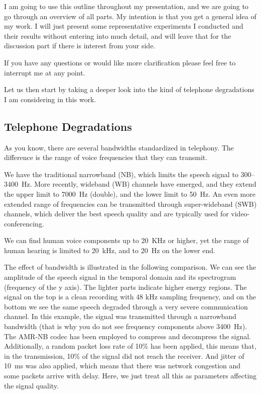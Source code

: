 \documentclass[a4paper]{article}
\begin{document}
I am going to use this outline throughout my presentation, and we are going to go through an overview of all parts. My intention is that you get a general idea of my work. I will just present some representative experiments I conducted and their results without entering into much detail, and will leave that for the discussion part if there is interest from your side.

If you have any questions or would like more clarification please feel free to interrupt me at any point.

Let us then start by taking a deeper look into the kind of telephone degradations I am considering in this work.



\subsection{Telephone Degradations}

As you know, there are several bandwidths standardized in telephony. The difference is the range of voice frequencies that they can transmit. 

We have the traditional narrowband (NB), which limits the speech signal to 300--3400~Hz. More recently, wideband (WB) channels have emerged, and they extend the upper limit to 7000~Hz (double), and the lower limit to 50~Hz. An even more extended range of frequencies can be transmitted through super-wideband (SWB) channels, which deliver the best speech quality and are typically used for video-conferencing.

We can find human voice components up to 20~KHz or higher, yet the range of human hearing is limited to 20~kHz, and to 20~Hz on the lower end.

The effect of bandwidth is illustrated in the following comparison. We can see the amplitude of the speech signal in the temporal domain and its spectrogram (frequency of the y axis). The lighter parts indicate higher energy regions. The signal on the top is a clean recording with 48 kHz sampling frequency, and on the bottom we see the same speech degraded through a very severe communication channel. In this example, the signal was transmitted through a narrowband bandwidth (that is why you do not see frequency components above 3400~Hz). The AMR-NB codec has been employed to compress and decompress the signal. Additionally, a random packet loss rate of 10\% has been applied, this means that, in the transmission, 10\% of the signal did not reach the receiver. And jitter of 10~ms was also applied, which means that there was network congestion and some packets arrive with delay. Here, we just treat all this as parameters affecting the signal quality.
\end{document}
